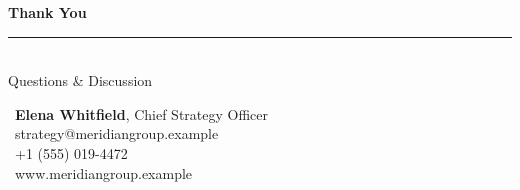 \documentclass[style=ciment]{powerdot}
\begin{document}
\begin{slide}{}
\vspace{1.3cm}
\begin{center}
{\huge\textbf{\textcolor{merinavy}{Thank You}}}\\[0.5cm]
{\color{meringold}\rule{4.2cm}{1.6pt}}\\[0.6cm]
{\large\textcolor{merislate}{Questions \& Discussion}}
\vspace{1.0cm}

\begin{tcolorbox}[statbox, width=0.7\linewidth]
\centering
\faUser\ \textbf{Elena Whitfield}, Chief Strategy Officer\\[4pt]
\faEnvelope\ strategy@meridiangroup.example\\[2pt]
\faPhone\ +1 (555) 019-4472\\[2pt]
\faGlobe\ www.meridiangroup.example
\end{tcolorbox}
\end{center}
\end{slide}
\end{document}
